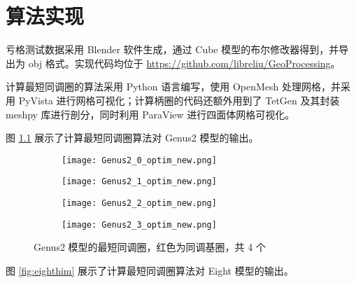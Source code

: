 
\chapter{算法实现}

亏格测试数据采用 Blender 软件生成，通过 Cube 模型的布尔修改器得到，并导出为 obj 格式。实现代码均位于 \url{https://github.com/libreliu/GeoProcessing}。

计算最短同调圈的算法采用 Python 语言编写，使用 OpenMesh 处理网格，并采用 PyVista 进行网格可视化；计算柄圈的代码还额外用到了 TetGen \cite{Si2015} 及其封装 meshpy 库进行剖分，同时利用 ParaView 进行四面体网格可视化。

图 \ref{fig:genus2him} 展示了计算最短同调圈算法对 Genus2 模型的输出。

\begin{figure}[h]
    \centering
    \begin{subfigure}{.2\textwidth}
        \centering
        \texttt{[image: Genus2\_0\_optim\_new.png]}
    \end{subfigure}
    \begin{subfigure}{.2\textwidth}
        \centering
        \texttt{[image: Genus2\_1\_optim\_new.png]}
    \end{subfigure}
    \begin{subfigure}{.2\textwidth}
        \centering
        \texttt{[image: Genus2\_2\_optim\_new.png]}
    \end{subfigure}
    \begin{subfigure}{.2\textwidth}
        \centering
        \texttt{[image: Genus2\_3\_optim\_new.png]}
    \end{subfigure}
    \caption{Genus2 模型的最短同调圈，红色为同调基圈，共 4 个}
    \label{fig:genus2him}
\end{figure}

图 \ref{fig:eighthim} 展示了计算最短同调圈算法对 Eight 模型的输出。

